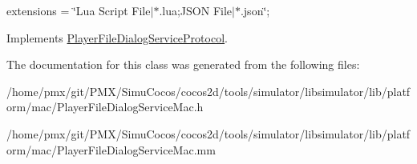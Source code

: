 extensions = \char`\"{}\+Lua Script File$\vert$$\ast$.\+lua;\+J\+S\+O\+N File$\vert$$\ast$.\+json\char`\"{}; 

Implements \hyperlink{classPlayerFileDialogServiceProtocol_ac9ef6f506a2ad68bcec05a0029b5cf83}{Player\+File\+Dialog\+Service\+Protocol}.



The documentation for this class was generated from the following files\+:\begin{DoxyCompactItemize}
\item 
/home/pmx/git/\+P\+M\+X/\+Simu\+Cocos/cocos2d/tools/simulator/libsimulator/lib/platform/mac/Player\+File\+Dialog\+Service\+Mac.\+h\item 
/home/pmx/git/\+P\+M\+X/\+Simu\+Cocos/cocos2d/tools/simulator/libsimulator/lib/platform/mac/Player\+File\+Dialog\+Service\+Mac.\+mm\end{DoxyCompactItemize}
